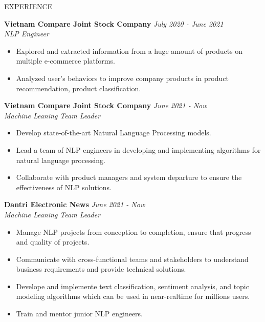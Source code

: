 \documentclass{resume} %
\begin{document}
\begin{rSection}{EXPERIENCE}

\textbf{Vietnam Compare Joint Stock Company} \hfill \textit{July 2020 - June 2021}\\
\textit{NLP Engineer}
 \begin{itemize}
     \item Explored and extracted information from a huge amount of products on multiple e-commerce platforms.
     \item Analyzed user's behaviors to improve company products in product recommendation, product classification.
 \end{itemize}

 \textbf{Vietnam Compare Joint Stock Company} \hfill \textit{June 2021 - Now}\\
\textit{Machine Leaning Team Leader}

 \begin{itemize}
     \item Develop state-of-the-art Natural Language Processing models.
     \item Lead a team of NLP engineers in developing and implementing algorithms for natural language processing.
     \item Collaborate with product managers and system departure to ensure the effectiveness of NLP solutions.
 \end{itemize}

\textbf{Dantri Electronic News} \hfill \textit{June 2021 - Now}\\
\textit{Machine Leaning Team Leader}

 \begin{itemize}
     \item Manage NLP projects from conception to completion, ensure that progress and quality of projects.
     \item Communicate with cross-functional teams and stakeholders to understand business requirements and provide technical solutions.
     \item Develope and implemente text classification, sentiment analysis, and topic modeling algorithms which can be used in near-realtime for millions users.
    \item Train and mentor junior NLP engineers.
 \end{itemize}
 

\end{rSection} 

\pagebreak
\end{document}
